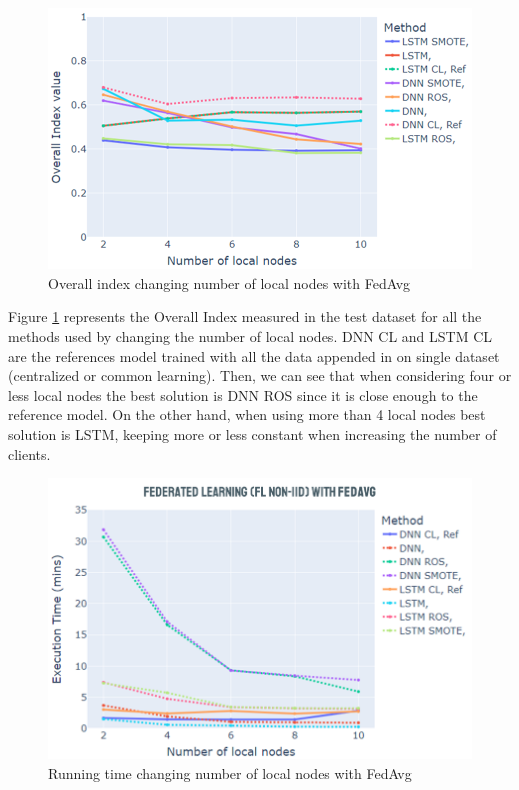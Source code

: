 \begin{figure}[H]
\centering
\includegraphics[scale=0.6]{img/change_local_nodes_metrics_fedavg.png}
\caption{Overall index changing number of local nodes with FedAvg}
\label{fig:change_local_nodes_metrics_fedavg}
\end{figure}

Figure \ref{fig:change_local_nodes_metrics_fedavg} represents the Overall Index measured in the test dataset for all the methods used by changing the number of local nodes. DNN CL and LSTM CL are the references model trained with all the data appended in on single dataset (centralized or common learning). Then, we can see that when considering four or less local nodes the best solution is DNN ROS since it is close enough to the reference model. On the other hand, when using more than 4 local nodes best solution is LSTM, keeping more or less constant when increasing the number of clients.

\begin{figure}[H]
\centering
\includegraphics[scale=0.6]{img/change_local_nodes_time_fedavg.png}
\caption{Running time changing number of local nodes with FedAvg}
\label{fig:change_local_nodes_time_fedavg}
\end{figure}


